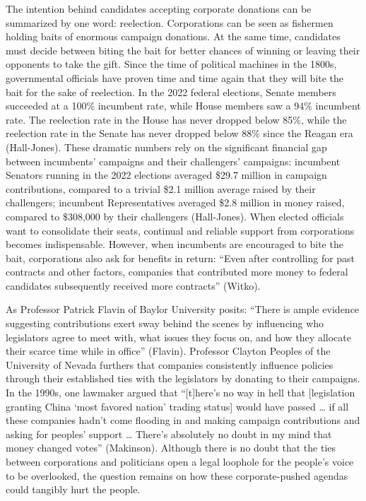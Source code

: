 The intention behind candidates accepting corporate donations can be summarized by one word: reelection. Corporations can be seen as fishermen holding baits of enormous campaign donations. At the same time, candidates must decide between biting the bait for better chances of winning or leaving their opponents to take the gift. Since the time of political machines in the 1800s, governmental officials have proven time and time again that they will bite the bait for the sake of reelection. In the 2022 federal elections, Senate members succeeded at a 100\% incumbent rate, while House members saw a 94\% incumbent rate. The reelection rate in the House has never dropped below 85\%, while the reelection rate in the Senate has never dropped below 88\% since the Reagan era (Hall-Jones). These dramatic numbers rely on the significant financial gap between incumbents’ campaigns and their challengers’ campaigns: incumbent Senators running in the 2022 elections averaged \$29.7 million in campaign contributions, compared to a trivial \$2.1 million average raised by their challengers; incumbent Representatives averaged \$2.8 million in money raised, compared to \$308,000 by their challengers (Hall-Jones). When elected officials want to consolidate their seats, continual and reliable support from corporations becomes indispensable. However, when incumbents are encouraged to bite the bait, corporations also ask for benefits in return: “Even after controlling for past contracts and other factors, companies that contributed more money to federal candidates subsequently received more contracts” (Witko).

As Professor Patrick Flavin of Baylor University posits: “There is ample evidence suggesting contributions exert sway behind the scenes by influencing who legislators agree to meet with, what issues they focus on, and how they allocate their scarce time while in office” (Flavin).  Professor Clayton Peoples of the University of Nevada furthers that companies consistently influence policies through their established ties with the legislators by donating to their campaigns. In the 1990s, one lawmaker argued that “[t]here’s no way in hell that [legislation granting China ‘most favored nation’ trading status] would have passed … if all these companies hadn’t come flooding in and making campaign contributions and asking for peoples’ support … There’s absolutely no doubt in my mind that money changed votes” (Makinson). Although there is no doubt that the ties between corporations and politicians open a legal loophole for the people’s voice to be overlooked, the question remains on how these corporate-pushed agendas could tangibly hurt the people. 

